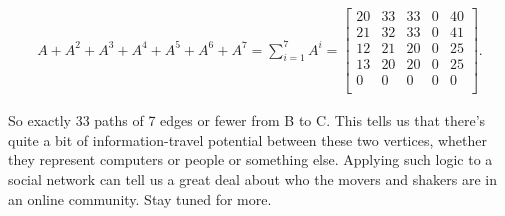\vspace{-.25in}
\begin{align*}
A + A^2 + A^3 + A^4 + A^5 + A^6 + A^7 = 
\sum_{i=1}^7 A^i = 
\begin{bmatrix}
20 & 33 & 33 &  0 & 40 \\
21 & 32 & 33 &  0 & 41 \\
12 & 21 & 20 &  0 & 25 \\
13 & 20 & 20 &  0 & 25 \\
 0 &  0 &  0 &  0 &  0 \\
\end{bmatrix}.
\end{align*}
\vspace{-.15in}

So exactly 33 paths of 7 edges or fewer from B to C. This tells us that there's
quite a bit of information-travel potential between these two vertices, whether
they represent computers or people or something else. Applying such logic to a
social network can tell us a great deal about who the movers and shakers are in
an online community. Stay tuned for more.




